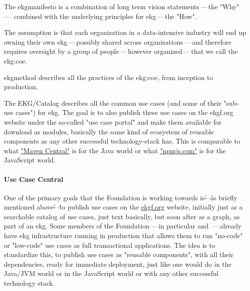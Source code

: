 \begin{description}[font=\bfseries,leftmargin=0cm]
    \item[\gls{ekgmanifesto}] The \gls{ekgmanifesto} is a combination of long term vision statements\,---\,the
                              "Why"\,---\, combined with the underlying principles for \gls{ekg}\,---\,the "How".
    \item[\gls{ekgmethod}]    The assumption is that each organization in a data-intensive industry will end up
                              owning their own \gls{ekg}\,---\,possibly shared across organizations\,---\,and therefore
                              requires oversight by a group of people\,---\,however organized\,---\,that we call
                              the \gls{ekg:coe}.

                              \gls{ekgmethod} describes all the practices of the \gls{ekg:coe},
                              from inception to production.
    \item[EKG/Catalog]        The EKG/Catalog describes all the common use cases (and some of their "sub-use cases")
                              for \gls{ekg}.
                              The goal is to also publish these use cases on the ekgf.org website under the so-called
                              "use case portal" and make them available for download as modules, basically the same
                              kind of ecosystem of reusable components as any other successful technology-stack has.
                              This is comparable to what \href{https://central.sonatype.org/}{"Maven Central"} is for
                              the Java world or what \href{https://docs.npmjs.com/about-npm}{"npmjs.com"} is for the
                              JavaScript world.
\end{description}

\paragraph{Use Case Central}

One of the primary goals that the Foundation is working towards is\'---\'as briefly mentioned above\'---\'to publish
use cases on the \href{https://ekgf.org}{ekgf.org} website, initially just as a searchable catalog of use cases,
just text basically, but soon after as a graph, as part of an \gls{ekg}.
Some members of the Foundation\,---\,in particular \agnos and \eccenca\,---\,already have \gls{ekg} infrastructure
running in production that allows them to run "no-code" or "\gls{low-code}" use cases as full transactional applications.
The idea is to standardize this, to publish use cases as "reusable components", with all their dependencies, ready
for immediate deployment, just like one would do in the Java/JVM world or in the JavaScript world or with any
other successful technology stack.

